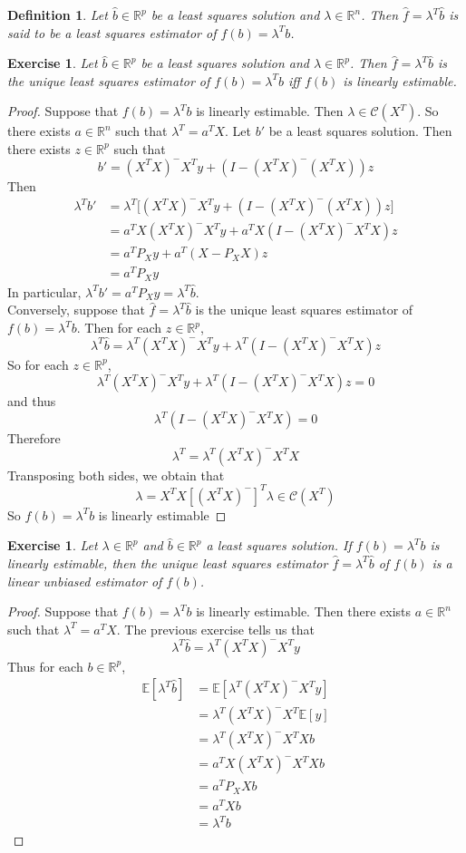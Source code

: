 \documentclass[12pt]{amsart}
\newtheorem{defn}[thm]{Definition}
\newtheorem{ex}[thm]{Exercise}
\newcommand{\lam}{\lambda}
\newcommand{\E}{\mathbb{E}}
\newcommand{\R}{\mathbb{R}}
\newcommand{\MC}{\mathcal{C}}
\begin{document}
\begin{defn}
Let $\hat{b} \in \R^p$ be a least squares solution and $\lam \in \R^n$. Then $\hat{f} = \lam^T \hat{b}$ is said to be a least squares estimator of $f(b) = \lam^T b$. 
\end{defn}

\begin{ex}
Let $\hat{b} \in \R^p$ be a least squares solution and $\lam \in \R^p$. Then $\hat{f} = \lam^T \hat{b}$ is the unique least squares estimator of $f(b) = \lam^Tb$ iff $f(b)$ is linearly estimable. 
\end{ex}

\begin{proof} Suppose that $f(b) = \lam^T b$ is linearly estimable. Then $\lam \in \MC(X^T)$. So there exists $a \in \R^n$ such that $\lam^T = a^TX$. Let $b'$ be a least squares solution. Then there exists $z \in \R^p$ such that $$b' = (X^TX)^-X^Ty + (I-(X^TX)^-(X^TX))z$$ Then 
\begin{align*}
\lam^Tb' 
&= \lam^T\bigg[ (X^TX)^-X^Ty + (I-(X^TX)^-(X^TX))z \bigg] \\
&= a^TX(X^TX)^-X^Ty + a^TX(I-(X^TX)^-X^TX)z \\
&= a^TP_Xy + a^T(X-P_XX)z \\
&= a^TP_Xy
\end{align*} 
In particular, $\lam^Tb' = a^TP_Xy = \lam^T\hat{b}$. \vspace{2mm}\\ Conversely, suppose that $\hat{f} = \lambda^T \hat{b}$ is the unique least squares estimator of $f(b) = \lam^T b$. Then for each $z \in \R^p$, $$\lam^T\hat{b} 
= \lam^T(X^TX)^-X^Ty + \lam^T(I-(X^TX)^-X^TX)z$$
So for each $z \in \R^p$, $$\lam^T(X^TX)^-X^Ty + \lam^T(I-(X^TX)^-X^TX)z = 0$$ and thus $$\lam^T(I-(X^TX)^-X^TX) = 0$$ Therefore $$ \lam^T = \lam^T(X^TX)^-X^TX$$ Transposing both sides, we obtain that $$\lam = X^TX[(X^TX)^-]^T\lam \in \MC(X^T)$$ So $f(b) = \lam^T b$ is linearly estimable
\end{proof}

\begin{ex}
Let $\lam \in \R^p$ and $\hat{b} \in \R^p$ a least squares solution. If $f(b) = \lam^Tb$ is linearly estimable, then the unique least squares estimator $\hat{f} = \lam^T\hat{b}$ of $f(b)$ is a linear unbiased estimator of $f(b)$.
\end{ex}

\begin{proof}
Suppose that $f(b) = \lam^Tb$ is linearly estimable. Then there exists $a \in \R^n$ such that $\lam^T = a^TX$. The previous exercise tells us that $$\lam^T\hat{b} = \lam^T(X^TX)^-X^Ty$$ Thus for each $b \in \R^p$,
\begin{align*}
\E[\lam^T\hat{b}] 
&= \E[\lam^T(X^TX)^-X^Ty] \\
&= \lam^T(X^TX)^-X^T\E[y] \\
&= \lam^T(X^TX)^-X^TXb \\ 
&= a^TX(X^TX)^-X^TXb \\
&= a^TP_XXb \\
&= a^TXb \\
&= \lam^T b
\end{align*}
\end{proof}
\end{document}
